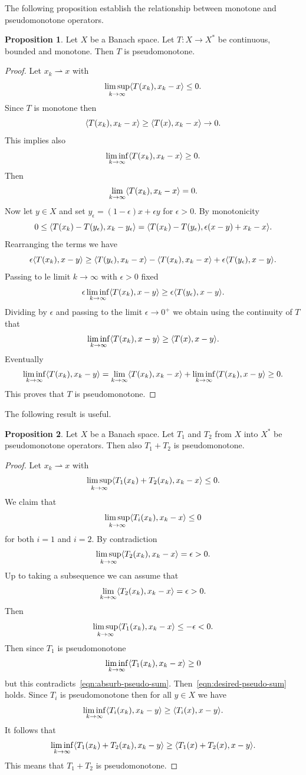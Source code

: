 \documentclass[a4paper,10pt,twoside]{amsbook}
\numberwithin{section}{chapter}
\numberwithin{equation}{chapter}
\theoremstyle{definition}
\newtheorem{prop}{Proposition}[chapter]
\DeclarePairedDelimiter{\dual}{\langle}{\rangle}
\begin{document}
The following proposition establish the relationship between monotone and pseudomonotone operators.
\begin{prop}
\label{prop:monotono-pseudomonotone}
Let $X$ be a Banach space. Let $T\colon X\to X^*$ be continuous, bounded and monotone. Then $T$ is pseudomonotone.
\end{prop}
\begin{proof}
Let $x_k\rightharpoonup x$ with
\[
\limsup_{k\to\infty}\dual{T(x_k),x_k-x}\le0.
\]
Since $T$ is monotone then
\[
\dual{T(x_k),x_k-x}\ge\dual{T(x),x_k-x}\to0.
\]
This implies also
\[
\liminf_{k\to\infty}\dual{T(x_k),x_k-x}\ge0.
\]
Then
\[
\lim_{k\to\infty}\dual{T(x_k),x_k-x}=0.
\]
Now let $y\in X$ and set $y_\epsilon=(1-\epsilon)x+\epsilon y$ for $\epsilon>0$. By monotonicity
\[
0\le\dual{T(x_k)-T(y_\epsilon),x_k-y_\epsilon}=\dual{T(x_k)-T(y_\epsilon),\epsilon(x-y)+x_k-x}.
\]
Rearranging the terms we have
\[
\epsilon\dual{T(x_k),x-y}\ge\dual{T(y_\epsilon),x_k-x}-\dual{T(x_k),x_k-x}+\epsilon\dual{T(y_\epsilon),x-y}.
\]
Passing to le limit $k\to\infty$ with $\epsilon>0$ fixed
\[
\epsilon\liminf_{k\to\infty}\dual{T(x_k),x-y}\ge\epsilon\dual{T(y_\epsilon),x-y}.
\]
Dividing by $\epsilon$ and passing to the limit $\epsilon\to0^+$ we obtain using the continuity of $T$ that
\[
\liminf_{k\to\infty}\dual{T(x_k),x-y}\ge\dual{T(x),x-y}.
\]
Eventually
\[
\liminf_{k\to\infty}\dual{T(x_k),x_k-y}=\lim_{k\to\infty}\dual{T(x_k),x_k-x}+\liminf_{k\to\infty}\dual{T(x_k),x-y}\ge0.
\]
This proves that $T$ is pseudomonotone.
\end{proof}
The following result is useful.
\begin{prop}
\label{prop:sum-pseudomonotone}
Let $X$ be a Banach space. Let $T_1$ and $T_2$ from $X$ into $X^*$ be pseudomonotone operators. Then also $T_1+T_2$ is pseudomonotone.
\end{prop}
\begin{proof}
Let $x_k\rightharpoonup x$ with
\[
\limsup_{k\to\infty}\dual{T_1(x_k)+T_2(x_k),x_k-x}\le0.
\]
We claim that
\begin{equation}
\label{eqn:desired-pseudo-sum}
\limsup_{k\to\infty}\dual{T_i(x_k),x_k-x}\le0
\end{equation}
for both $i=1$ and $i=2$. By contradiction
\[
\limsup_{k\to\infty}\dual{T_2(x_k),x_k-x}=\epsilon>0.
\]
Up to taking a subsequence we can assume that
\[
\lim_{k\to\infty}\dual{T_2(x_k),x_k-x}=\epsilon>0.
\]
Then
\begin{equation}
\label{eqn:absurb-pseudo-sum}
\limsup_{k\to\infty}\dual{T_1(x_k),x_k-x}\le-\epsilon<0.
\end{equation}
Then since $T_1$ is pseudomonotone
\[
\liminf_{k\to\infty}\dual{T_1(x_k),x_k-x}\ge0
\]
but this contradicts~\eqref{eqn:absurb-pseudo-sum}. Then~\eqref{eqn:desired-pseudo-sum} holds. Since $T_i$ is pseudomonotone then for all $y\in X$ we have
\[
\liminf_{k\to\infty}\dual{T_i(x_k),x_k-y}\ge\dual{T_i(x),x-y}.
\]
It follows that
\[
\liminf_{k\to\infty}\dual{T_1(x_k)+T_2(x_k),x_k-y}\ge\dual{T_1(x)+T_2(x),x-y}.
\]
This means that $T_1+T_2$ is pseudomonotone.
\end{proof}
\end{document}
